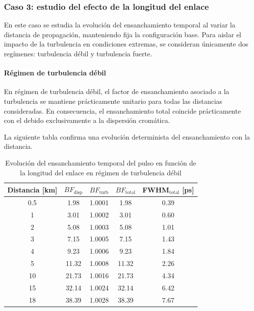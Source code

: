 \subsubsection*{Caso 3: estudio del efecto de la longitud del enlace}

En este caso se estudia la evolución del ensanchamiento temporal al variar la distancia de propagación, manteniendo fija la configuración base. Para aislar el impacto de la turbulencia en condiciones extremas, se consideran únicamente dos regímenes: turbulencia débil y turbulencia fuerte.


\paragraph{Régimen de turbulencia débil}
En régimen de turbulencia débil, el factor de ensanchamiento asociado a la turbulencia se mantiene prácticamente unitario para todas las distancias consideradas. En consecuencia, el ensanchamiento total coincide prácticamente con el debido exclusivamente a la dispersión cromática.

La siguiente tabla confirma una evolución determinista del ensanchamiento con la distancia.

\begin{table}[H]
\centering
\hspace*{-0.6cm}
\renewcommand{\arraystretch}{1.2}
\begin{tabular}{|c|c|c|c|c|}
\hline
\textbf{Distancia [km]} &
\textbf{$BF_{\mathrm{disp}}$} &
\textbf{$BF_{\mathrm{turb}}$} &
\textbf{$BF_{\mathrm{total}}$} &
\textbf{FWHM$_{\mathrm{total}}$ [ps]} \\
\hline
0.5  & 1.98  & 1.0001 & 1.98  & 0.39 \\
1    & 3.01  & 1.0002 & 3.01  & 0.60 \\
2    & 5.08  & 1.0003 & 5.08  & 1.01 \\
3    & 7.15  & 1.0005 & 7.15  & 1.43 \\
4    & 9.23  & 1.0006 & 9.23  & 1.84 \\
5    & 11.32 & 1.0008 & 11.32 & 2.26 \\
10   & 21.73 & 1.0016 & 21.73 & 4.34 \\
15   & 32.14 & 1.0024 & 32.14 & 6.42 \\
18   & 38.39 & 1.0028 & 38.39 & 7.67 \\
\hline
\end{tabular}
\caption{Evolución del ensanchamiento temporal del pulso en función de la longitud del enlace en régimen de turbulencia débil}
\label{tabla_atm_longitud_debil}
\end{table}


